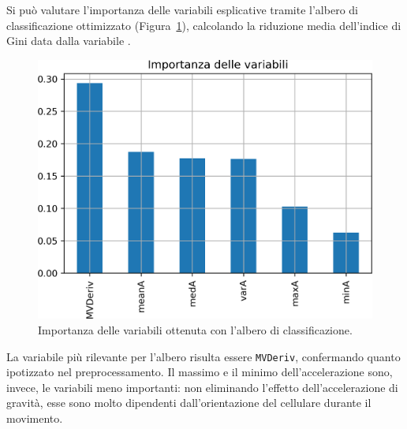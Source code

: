 \documentclass[main.tex]{subfiles}
\begin{document}
Si può valutare l'importanza delle variabili esplicative tramite l'albero di classificazione ottimizzato (Figura~\ref{fig:importance-Tree}), calcolando la riduzione media dell'indice di Gini data dalla variabile \cite{DecisionTreeClassifier}.
\begin{figure}[H]
	\centering
	\includegraphics[width=\confusion]{../../figure/importance-Tree.png}
	\caption{Importanza delle variabili ottenuta con l'albero di classificazione.}
	\label{fig:importance-Tree}
\end{figure}
La variabile più rilevante per l'albero risulta essere \texttt{MVDeriv}, confermando quanto ipotizzato nel preprocessamento. Il massimo e il minimo dell'accelerazione sono, invece, le variabili meno importanti: non eliminando l'effetto dell'accelerazione di gravità, esse sono molto dipendenti dall'orientazione del cellulare durante il movimento.
\end{document}

